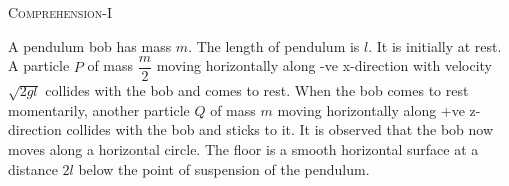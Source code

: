 \begin{center}
    \textsc{Comprehension-I}
\end{center}
A pendulum bob has mass $m$. The length of pendulum is $l$. It is initially at rest. A particle $P$ of mass $\dfrac{m}{2}$ moving horizontally along -ve x-direction with velocity $\sqrt{2gl}$ collides with the bob and comes to rest. When the bob comes to rest momentarily, another particle $Q$ of mass $m$ moving horizontally along +ve z-direction collides with the bob and sticks to it. It is observed that the bob now moves along a horizontal circle. The floor is a smooth horizontal surface at a distance $2l$ below the point of suspension of the pendulum. 

\begin{center}
\end{center} 

